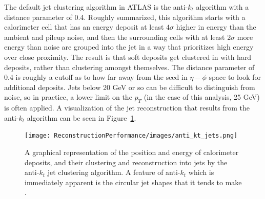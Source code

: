 The default jet clustering algorithm in ATLAS is the anti-$k_t$ algorithm \cite{antikt}
with a distance parameter of 0.4.  Roughly summarized, this algorithm starts with a calorimeter cell that 
has an energy deposit at least $4\sigma$ higher in energy than the ambient and pileup noise, 
and then the surrounding cells with at least $2\sigma$ more energy than noise are grouped into 
the jet in a way that prioritizes high energy over close proximity.  The result is that soft deposits get 
clustered in with hard deposits, rather than clustering amongst themselves.  The distance parameter of 0.4 is 
roughly a cutoff as to how far away from the seed in $\eta-\phi$ space to look for 
additional deposits.   Jets below 20 GeV or so can be difficult to distinguish from noise, so in practice, a lower limit on 
the $p_T$ (in the case of this analysis, 25 GeV) is often applied.  A visualization of the jet reconstruction that results
from the anti-$k_t$ algorithm can be seen in Figure~\ref{fig:anti_kt_jets}.


\begin{figure}
    \center
	\texttt{[image: ReconstructionPerformance/images/anti\_kt\_jets.png]}
	\caption{A graphical representation of the position and energy of calorimeter deposits, and their clustering and reconstruction into jets by the anti-$k_t$ jet clustering algorithm.  A feature of anti-$k_t$ which is immediately apparent is the circular jet shapes that it tends to make \cite{antikt}.  \label{fig:anti_kt_jets}  }
\end{figure}







